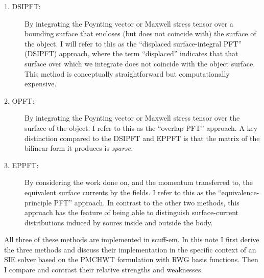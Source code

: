 \begin{description}

\item[1. DSIPFT:] By integrating the Poynting vector or Maxwell stress
tensor over a bounding surface that encloses (but does not
coincide with) the surface of the object. I will refer to this
as the ``displaced surface-integral PFT'' (DSIPFT) approach, where the term
``displaced'' indicates that that surface over which we integrate 
does not coincide with the object surface. This method is conceptually
straightforward but computationally expensive.

\item[2. OPFT: ] By integrating the Poynting vector or Maxwell stress
tensor over the surface of the object. I refer to this
as the ``overlap PFT'' approach. A key distinction compared to
the DSIPFT and EPPFT is that the matrix of the bilinear form it
produces is \textit{sparse.}

\item[3. EPPFT: ] By considering the work done on, and the momentum
transferred to, the equivalent surface currents by the fields.
I refer to this as the ``equivalence-principle PFT'' approach.
In contrast to the other two methods, this approach has the 
feature of being able to distinguish surface-current distributions
induced by soures inside and outside the body.

\end{description}

All three of these methods are implemented in {\sc scuff-em}. In this
note I first derive the three methods and discuss their implementation
in the specific context of an SIE solver based on the PMCHWT formulation
with RWG basis functions. Then I compare and contrast their
relative strengths and weaknesses.
